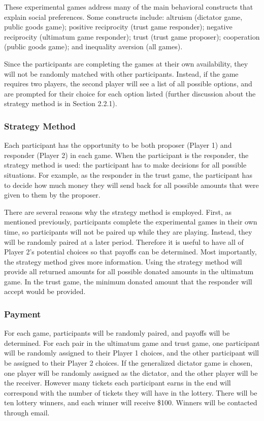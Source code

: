 \documentclass{article}
\begin{document}
These experimental games address many of the main behavioral constructs that explain social preferences. Some constructs include: altruism (dictator game, public goods game); positive reciprocity (trust game responder); negative reciprocity (ultimatum game responder); trust (trust game proposer); cooperation (public goods game); and inequality aversion (all games). 

Since the participants are completing the games at their own availability, they will not be randomly matched with other participants. Instead, if the game requires two players, the second player will see a list of all possible options, and are prompted for their choice for each option listed (further discussion about the strategy method is in Section 2.2.1). 


\subsubsection{Strategy Method}

Each participant has the opportunity to be both proposer (Player 1) and responder (Player 2) in each game. When the participant is the responder, the strategy method is used: the participant has to make decisions for all possible situations. For example, as the responder in the trust game, the participant has to decide how much money they will send back for all possible amounts that were given to them by the proposer. 

There are several reasons why the strategy method is employed. First, as mentioned previously, participants complete the experimental games in their own time, so participants will not be paired up while they are playing. Instead, they will be randomly paired at a later period. Therefore it is useful to have all of Player 2\rq s potential choices so that payoffs can be determined. Most importantly, the strategy method gives more information. Using the strategy method will provide all returned amounts for all possible donated amounts in the ultimatum game. In the trust game, the minimum donated amount that the responder will accept would be provided. 

\subsubsection{Payment}

For each game, participants will be randomly paired, and payoffs will be determined. For each pair in the ultimatum game and trust game, one participant will be randomly assigned to their Player 1 choices, and the other participant will be assigned to their Player 2 choices. If the generalized dictator game is chosen, one player will be randomly assigned as the dictator, and the other player will be the receiver. However many tickets each participant earns in the end will correspond with the number of tickets they will have in the lottery. There will be ten lottery winners, and each winner will receive \$100. Winners will be contacted through email. 
\end{document}
